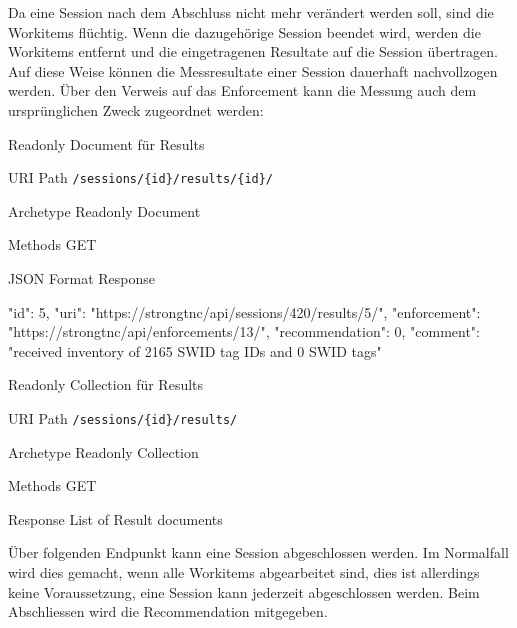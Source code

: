 Da eine Session nach dem Abschluss nicht mehr verändert werden soll, sind die
Workitems flüchtig. Wenn die dazugehörige Session beendet wird, werden die
Workitems entfernt und die eingetragenen Resultate auf die Session übertragen.
Auf diese Weise können die Messresultate einer Session dauerhaft nachvollzogen
werden. Über den Verweis auf das Enforcement kann die Messung auch dem
ursprünglichen Zweck zugeordnet werden:

\begin{listing}[H]
\caption{Readonly Document für Results}
\begin{mdframed}[style=def]
\begin{description*}
	\item[URI Path] \texttt{/sessions/\{id\}/results/\{id\}/}
	\item[Archetype] Readonly Document
	\item[Methods] GET
	\item[JSON Format Response] \hfill
\begin{jsoncode}
{
	"id": 5,
	"uri": "https://strongtnc/api/sessions/420/results/5/",
	"enforcement": "https://strongtnc/api/enforcements/13/",
	"recommendation": 0,	 
	"comment": "received inventory of 2165 SWID tag IDs and 0 SWID tags"
}
\end{jsoncode}
\end{description*}
\end{mdframed}
\end{listing}

\begin{listing}[H]
\caption{Readonly Collection für Results}
\begin{mdframed}[style=def]
\begin{description*}
	\item[URI Path] \texttt{/sessions/\{id\}/results/}
	\item[Archetype] Readonly Collection
	\item[Methods] GET
	\item[Response] List of Result documents
\end{description*}
\end{mdframed}
\end{listing}

Über folgenden Endpunkt kann eine Session abgeschlossen werden. Im Normalfall
wird dies gemacht, wenn alle Workitems abgearbeitet sind, dies ist allerdings
keine Voraussetzung, eine Session kann jederzeit abgeschlossen werden. Beim
Abschliessen wird die Recommendation mitgegeben.

